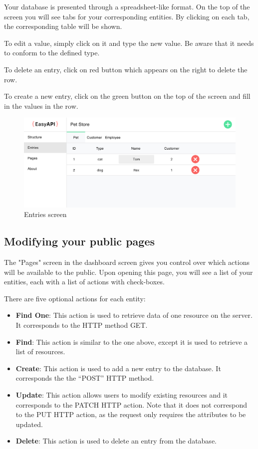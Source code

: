 Your database is presented through a spreadsheet-like format. On the top of the screen you will see tabs for your corresponding entities. By clicking on each tab, the corresponding table will be shown.

To edit a value, simply click on it and type the new value. Be aware that it needs to conform to the defined type.

To delete an entry, click on red button which appears on the right to delete the row.

To create a new entry, click on the green button on the top of the screen and fill in the values in the row.


\begin{figure}
\label{entriesimg}
\centerline{\includegraphics[scale=0.4]{screenshots/entries.png}}
\caption{Entries screen}
\end{figure}

\subsection{Modifying your public pages}
The "Pages" screen in the dashboard screen gives you control over which actions will be available to the public. Upon opening this page, you will see a list of your entities, each with a list of actions with check-boxes.

There are five optional actions for each entity:

\begin{itemize}
  \item \textbf{Find One}: This action is used to retrieve data of one resource on the server. It corresponds to the HTTP method GET.
  \item \textbf{Find}: This action is similar to the one above, except it is used to retrieve a list of resources.
  \item \textbf{Create}: This action is used to add a new entry to the database. It corresponds the the ``POST'' HTTP method.
  \item \textbf{Update}: This action allows users to modify existing resources and it corresponds to the PATCH HTTP action. Note that it does not correspond to the PUT HTTP action, as the request only requires the attributes to be updated.
  \item \textbf{Delete}: This action is used to delete an entry from the database.
\end{itemize}

